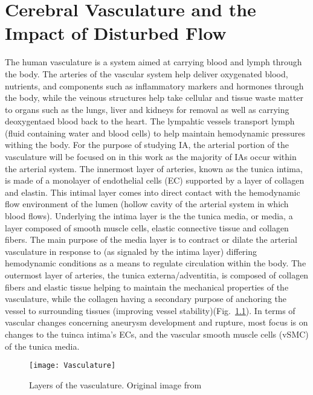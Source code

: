 \cleartooddpage[\thispagestyle{empty}]
\chapter{Cerebral Vasculature and the Impact of Disturbed Flow}\label{CHAPTER2}
The human vasculature is a system aimed at carrying blood and lymph through the body. The arteries of the vascular system help deliver oxygenated blood, nutrients, and components such as inflammatory markers and hormones through the body, while the veinous structures help take cellular and tissue waste matter to organs such as the lungs, liver and kidneys for removal as well as carrying deoxygentaed blood back to the heart. The lympahtic vessels transport lymph (fluid containing water and blood cells) to help maintain hemodynamic pressures withing the body. For the purpose of studying IA, the arterial portion of the vasculature will be focused on in this work as the majority of IAs occur within the arterial system. The innermost layer of arteries, known as the tunica intima, is made of a monolayer of endothelial cells (EC) supported by a layer of collagen and elastin. This intimal layer comes into direct contact with the hemodynamic flow environment of the lumen (hollow cavity of the arterial system in which blood flows). Underlying the intima layer is the the tunica media, or media, a layer composed of smooth muscle cells, elastic connective tissue and collagen fibers. The main purpose of the media layer is to contract or dilate the arterial vasculature in response to (as signaled by the intima layer) differing hemodynamic conditions as a means to regulate circulation within the body\cite{bogunovic2019impaired,michel2018genetics}. The outermost layer of arteries, the tunica externa/adventitia, is composed of collagen fibers and elastic tissue helping to maintain the mechanical properties of the vasculature, while the collagen having a secondary purpose of anchoring the vessel to surrounding tissues (improving vessel stability)(Fig.~\ref{Vasculature_Layers}). In terms of vascular changes concerning aneurysm development and rupture, most focus is on changes to the tuinca intima's ECs, and the vascular smooth muscle cells (vSMC) of the tunica media.

\begin{figure}[!h]
  \begin{center}
    \texttt{[image: Vasculature]}
  \end{center}
  \caption{Layers of the vasculature. Original image from \cite{WIKI_Vessel}}
  \label{Vasculature_Layers}
\end{figure}


